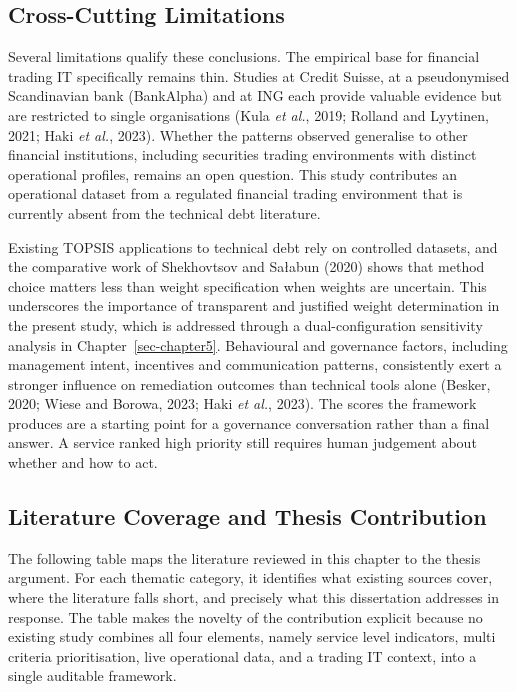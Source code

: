 \documentclass[
  12pt,
  letterpaper,
  12pt,
  oneside,
  english,
  onehalfspacing,
  headsepline]{MastersDoctoralThesis}
\begin{document}
\subsection{Cross-Cutting Limitations}\label{cross-cutting-limitations}

Several limitations qualify these conclusions. The empirical base for
financial trading IT specifically remains thin. Studies at Credit
Suisse, at a pseudonymised Scandinavian bank (BankAlpha) and at ING each
provide valuable evidence but are restricted to single organisations
(Kula \emph{et al.}, 2019; Rolland and Lyytinen, 2021; Haki \emph{et
al.}, 2023). Whether the patterns observed generalise to other financial
institutions, including securities trading environments with distinct
operational profiles, remains an open question. This study contributes
an operational dataset from a regulated financial trading environment
that is currently absent from the technical debt literature.

Existing TOPSIS applications to technical debt rely on controlled
datasets, and the comparative work of Shekhovtsov and Sałabun (2020)
shows that method choice matters less than weight specification when
weights are uncertain. This underscores the importance of transparent
and justified weight determination in the present study, which is
addressed through a dual-configuration sensitivity analysis in
Chapter~\ref{sec-chapter5}. Behavioural and governance factors,
including management intent, incentives and communication patterns,
consistently exert a stronger influence on remediation outcomes than
technical tools alone (Besker, 2020; Wiese and Borowa, 2023; Haki
\emph{et al.}, 2023). The scores the framework produces are a starting
point for a governance conversation rather than a final answer. A
service ranked high priority still requires human judgement about
whether and how to act.

\subsection{Literature Coverage and Thesis
Contribution}\label{literature-coverage-and-thesis-contribution}

The following table maps the literature reviewed in this chapter to the
thesis argument. For each thematic category, it identifies what existing
sources cover, where the literature falls short, and precisely what this
dissertation addresses in response. The table makes the novelty of the
contribution explicit because no existing study combines all four
elements, namely service level indicators, multi criteria
prioritisation, live operational data, and a trading IT context, into a
single auditable framework.
\end{document}
